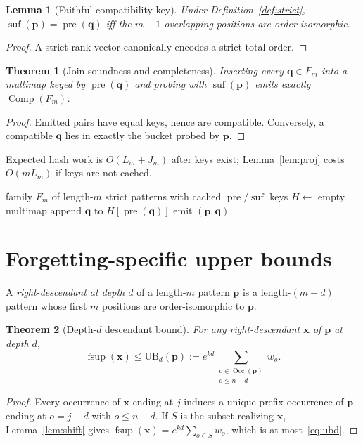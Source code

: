 \documentclass[preprint,12pt]{elsarticle}
\DeclareMathOperator{\fsup}{fsup}
\DeclareMathOperator{\Occ}{Occ}
\DeclareMathOperator{\pre}{pre}
\DeclareMathOperator{\suf}{suf}
\DeclareMathOperator{\Comp}{Comp}
\newcommand{\UB}{\mathrm{UB}}
\theoremstyle{plain}
\newtheorem{theorem}{Theorem}
\newtheorem{lemma}{Lemma}
\theoremstyle{definition}
\theoremstyle{remark}
\begin{document}
\begin{lemma}[Faithful compatibility key]
\label{lem:key}
Under Definition~\ref{def:strict}, $\suf(\mathbf{p})=\pre(\mathbf{q})$ iff the $m-1$ overlapping positions are order-isomorphic.
\end{lemma}
\begin{proof}
A strict rank vector canonically encodes a strict total order.
\end{proof}

\begin{theorem}[Join soundness and completeness]
\label{thm:join}
Inserting every $\mathbf{q}\in F_m$ into a multimap keyed by $\pre(\mathbf{q})$ and probing with $\suf(\mathbf{p})$ emits exactly $\Comp(F_m)$.
\end{theorem}
\begin{proof}
Emitted pairs have equal keys, hence are compatible. Conversely, a compatible $\mathbf{q}$ lies in exactly the bucket probed by $\mathbf{p}$.
\end{proof}

Expected hash work is $O(L_m+J_m)$ after keys exist; Lemma~\ref{lem:proj} costs $O(mL_m)$ if keys are not cached.

\begin{algorithm}[t]
\caption{HJ-Compatible: emit $\Comp(F_m)$}
\label{alg:hj}
\begin{algorithmic}[1]
\Require family $F_m$ of length-$m$ strict patterns with cached $\pre/\suf$ keys
\State $H\leftarrow$ empty multimap
  \State append $\mathbf{q}$ to $H[\pre(\mathbf{q})]$
\EndFor
{}
  \For{each $\mathbf{q}$ in $H.\mathrm{lookup}(\suf(\mathbf{p}))$}
    \State emit $(\mathbf{p},\mathbf{q})$
  \EndFor
\EndFor
\end{algorithmic}
\end{algorithm}

\section{Forgetting-specific upper bounds}
\label{sec:bounds}

A \emph{right-descendant at depth $d$} of a length-$m$ pattern $\mathbf{p}$ is a length-$(m+d)$ pattern whose first $m$ positions are order-isomorphic to $\mathbf{p}$.

\begin{theorem}[Depth-$d$ descendant bound]
\label{thm:ubd}
For any right-descendant $\mathbf{x}$ of $\mathbf{p}$ at depth $d$,
\begin{equation}
\label{eq:ubd}
\fsup(\mathbf{x})\le \UB_d(\mathbf{p})
:=e^{kd}\sum_{\substack{o\in\Occ(\mathbf{p})\\ o\le n-d}} w_o.
\end{equation}
\end{theorem}
\begin{proof}
Every occurrence of $\mathbf{x}$ ending at $j$ induces a unique prefix occurrence of $\mathbf{p}$ ending at $o=j-d$ with $o\le n-d$. If $S$ is the subset realizing $\mathbf{x}$, Lemma~\ref{lem:shift} gives $\fsup(\mathbf{x})=e^{kd}\sum_{o\in S}w_o$, which is at most~\eqref{eq:ubd}.
\end{proof}
\end{document}
